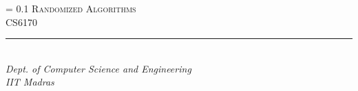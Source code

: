 \documentclass[a4paper,notoc,openany]{tufte-book}%
\newlength{\drop}
\newcommand*{\titleS}{\begingroup%
	\drop = 0.1\textheight
	\centering
	\vspace*{\drop}
	{\Huge \textsc{Randomized Algorithms}}\\[\baselineskip]
	{\large CS6170}\\[\baselineskip]
	\vfill
	\rule{0.4\textwidth}{0.4pt}\\[\baselineskip]
	{\large\itshape  Dept. of Computer Science and Engineering\\ IIT Madras}\par
	\vspace*{\drop}
	\endgroup}
\begin{document}
\titleS

\tableofcontents






\end{document}
